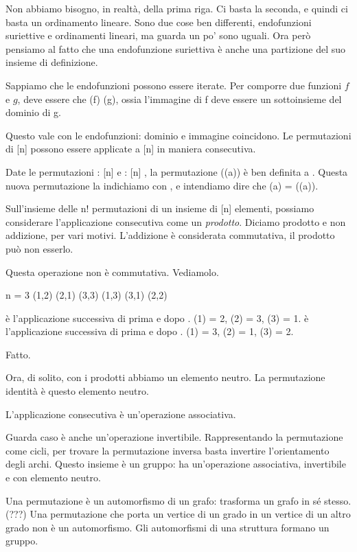 Non abbiamo bisogno, in realt\`a, della prima riga.
Ci basta la seconda, e quindi ci basta un ordinamento lineare.
Sono due cose ben differenti,
endofunzioni suriettive e ordinamenti lineari, ma guarda un po' sono uguali.
Ora per\`o pensiamo al fatto che una endofunzione suriettiva \`e anche una partizione del suo insieme di definizione.

Sappiamo che le endofunzioni possono essere iterate.
Per comporre due funzioni $f$ e $g$, deve essere che (f) \subseteq {}(g), ossia l'immagine
di f deve essere un sottoinsieme del dominio di g.

Questo vale con le endofunzioni: dominio e immagine coincidono.
Le permutazioni di [n] possono essere applicate a [n] in maniera consecutiva.

Date le permutazioni \pi : [n] \to [n] e \rho : [n] \to [n], la permutazione \rho (\pi (a)) \`e ben definita \forall a \in [n].
Questa nuova permutazione la indichiamo con \pi \rho, e intendiamo dire che \pi \rho (a) = \rho (\pi (a)).

Sull'insieme delle n! permutazioni di un insieme di [n] elementi, possiamo considerare l'applicazione consecutiva come un \emph{prodotto}.
Diciamo prodotto e non addizione, per vari motivi.
L'addizione \`e considerata commutativa, il prodotto pu\`o non esserlo.

Questa operazione non \`e commutativa.
Vediamolo.

n = 3
\pi (1,2) (2,1) (3,3)
\rho (1,3) (3,1) (2,2)

\pi \rho \`e l'applicazione successiva di prima \pi e dopo \rho.
\pi \rho (1) = 2, \pi \rho (2) = 3, \pi \rho (3) = 1.
\rho \pi \`e l'applicazione successiva di prima \rho e dopo \pi.
\rho \pi (1) = 3, \rho \pi (2) = 1, \rho \pi (3) = 2.

Fatto.

Ora, di solito, con i prodotti abbiamo un elemento neutro.
La permutazione identit\`a \`e questo elemento neutro.

L'applicazione consecutiva \`e un'operazione associativa.


Guarda caso \`e anche un'operazione invertibile.
Rappresentando la permutazione come cicli, per trovare la permutazione inversa basta invertire l'orientamento degli archi.
Questo insieme \`e un gruppo: ha un'operazione associativa, invertibile e con elemento neutro.


Una permutazione \`e un automorfismo di un grafo: trasforma un grafo in s\'e stesso.
(???)
Una permutazione che porta un vertice di un grado in un vertice di un altro grado non \`e un automorfismo.
Gli automorfismi di una struttura formano un gruppo.

